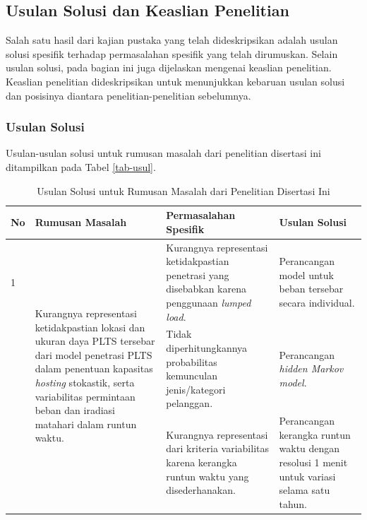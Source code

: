 {{{{{%
\subsection{Usulan Solusi dan Keaslian Penelitian}
Salah satu hasil dari kajian pustaka yang telah dideskripsikan adalah usulan solusi spesifik terhadap permasalahan spesifik yang telah dirumuskan. Selain usulan solusi, pada bagian ini juga dijelaskan mengenai keaslian penelitian. Keaslian penelitian dideskripsikan untuk menunjukkan kebaruan usulan solusi dan posisinya diantara penelitian-penelitian sebelumnya.

\subsubsection{Usulan Solusi}
Usulan-usulan solusi untuk rumusan masalah dari penelitian disertasi ini ditampilkan pada Tabel \ref{tab-usul}.
\bgroup
\vspace{4pt}
{\renewcommand{\arraystretch}{1.3}
\begin{table}
	\caption{Usulan Solusi untuk Rumusan Masalah dari Penelitian Disertasi Ini}
	\vspace{-12pt}
	\begin{center}
		\begin{tabular}{|m{1.2em}|m{11.2em}|m{20em}|m{16em}|}
			\cline{1-4} 
			\textbf{No}&	
			\textbf{Rumusan Masalah}&
			\textbf{Permasalahan Spesifik}&
			\textbf{Usulan Solusi}\\
			\hline 1 & \multirow{4}{*}{\parbox{11.2em}{Kurangnya representasi ketidakpastian lokasi dan ukuran daya PLTS tersebar dari model penetrasi PLTS dalam penentuan kapasitas \textit{hosting} stokastik, serta variabilitas permintaan beban dan iradiasi matahari dalam runtun waktu.}} &Kurangnya representasi ketidakpastian penetrasi yang disebabkan karena penggunaan \textit{lumped load}. & Perancangan model untuk beban tersebar secara individual. \\
			\cline{3-4}& &Tidak diperhitungkannya probabilitas kemunculan jenis/kategori pelanggan. &Perancangan \textit{hidden Markov model}. \\
			\cline{3-4}& &Kurangnya representasi dari kriteria variabilitas karena kerangka runtun waktu yang disederhanakan. &Perancangan kerangka runtun waktu dengan resolusi 1 menit untuk variasi selama satu tahun. \\

\end{tabular}
\end{center}
\end{table}}}}}}}

